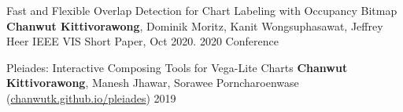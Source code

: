\begin{cvpubs}
  \cvpub
    {Fast and Flexible Overlap Detection for Chart Labeling with Occupancy Bitmap} %
    {\textbf{Chanwut Kittivorawong}, Dominik Moritz, Kanit Wongsuphasawat, Jeffrey Heer IEEE VIS Short Paper, Oct 2020.} %
    {2020} %
    {Conference} %

  \cvpub
    {Pleiades: Interactive Composing Tools for Vega-Lite Charts} %
    {\textbf{Chanwut Kittivorawong}, Manesh Jhawar, Sorawee Porncharoenwase (\href{https://chanwutk.github.io/pleiades}{chanwutk.github.io/pleiades})} %
    {2019} %
    {} %
\end{cvpubs}
